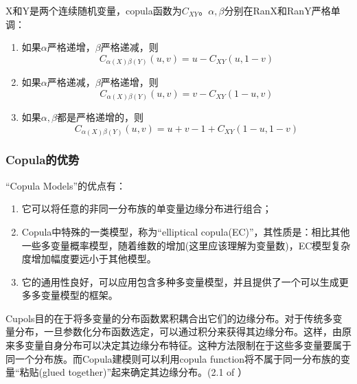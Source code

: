 \begin{theorem}
    X和Y是两个连续随机变量，copula函数为$C_{XY}$。$\alpha,\beta$分别在RanX和RanY严格单调：
    \begin{enumerate}
        \item 如果$\alpha$严格递增，$\beta$严格递减，则
            \begin{equation*}
                C_{\alpha(X)\beta(Y)}(u,v) = u- C_{XY}(u,1-v)
            \end{equation*}
        \item 如果$\alpha$严格递减，$\beta$严格递增，则
            \begin{equation*}
                 C_{\alpha(X)\beta(Y)}(u,v) = v- C_{XY}(1-u,v)
            \end{equation*}
        \item 如果$\alpha,\beta$都是严格递增的，则
            \begin{equation*}
                C_{\alpha(X)\beta(Y)}(u,v) = u+v-1+C_{XY}(1-u,1-v)
            \end{equation*}
    \end{enumerate}
    \label{thr2.4.4}
\end{theorem}


\subsubsection{Copula的优势}


``Copula Models''的优点有\cite{Smith2009}：
\begin{enumerate}
    \item 它可以将任意的非同一分布族的单变量边缘分布进行组合；
    \item Copula中特殊的一类模型，称为``elliptical copula(EC)''，其性质是：相比其他一些多变量概率模型，随着维数的增加(这里应该理解为变量数)，EC模型复杂度增加幅度要远小于其他模型。
    \item 它的通用性良好，可以应用包含多种多变量模型，并且提供了一个可以生成更多多变量模型的框架。
\end{enumerate}

\textcolor[rgb]{1,0,0}{Cupols目的在于将多变量的分布函数累积耦合出它们的边缘分布。对于传统多变量分布，一旦参数化分布函数选定，可以通过积分来获得其边缘分布。这样，由原来多变量自身分布可以决定其边缘分布特征。这种方法限制在于这些多变量要属于同一个分布族。而Copula建模则可以利用copula function将不属于同一分布族的变量``粘贴(glued together)''起来确定其边缘分布。(2.1 of \cite{Smith2009}}）



